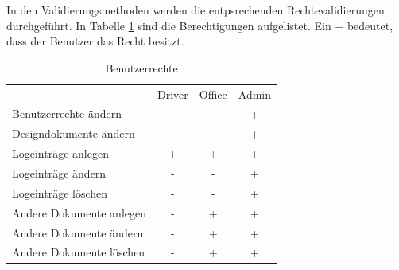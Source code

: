 \noindent In den Validierungsmethoden werden die entpsrechenden Rechtevalidierungen durchgeführt. In Tabelle \ref{tab:rechte} sind die Berechtigungen aufgelistet. Ein + bedeutet, dass der Benutzer das Recht besitzt.

\begin{table}
\begin{tabular}{lccc}
	& Driver & Office & Admin \\
	Benutzerrechte ändern & - & - & + \\
	Designdokumente ändern & - & - & + \\
	Logeinträge anlegen & + & + & + \\
	Logeinträge ändern & - & - & + \\
	Logeinträge löschen & - & - & + \\
	Andere Dokumente anlegen & - & + & + \\
	Andere Dokumente ändern & - & + & + \\
	Andere Dokumente löschen & - & + & +
\end{tabular}
\caption{Benutzerrechte}
\label{tab:rechte}
\end{table}

